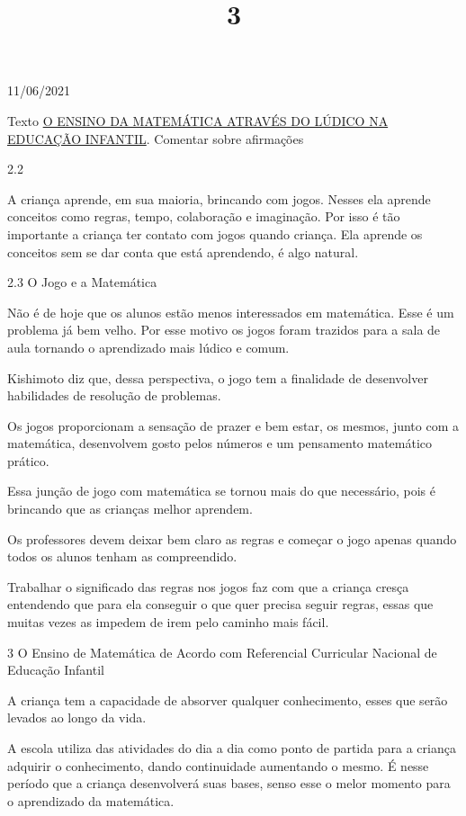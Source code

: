\documentclass{SchoolBook}
\begin{document}
    \begin{day}{11/06/2021}
        \title{3}{Texto \href{https://drive.google.com/file/d/167RWN6Z-7H5BkAholpEdeZX116oSQB6u/view}{O ENSINO DA MATEMÁTICA ATRAVÉS DO LÚDICO NA EDUCAÇÃO INFANTIL}. Comentar sobre afirmações}
        
        2.2
        
        A criança aprende, em sua maioria, brincando com jogos. Nesses ela aprende conceitos como regras, tempo, colaboração e imaginação. Por isso é tão importante a criança ter contato com jogos quando criança. Ela aprende os conceitos sem se dar conta que está aprendendo, é algo natural.
        
        2.3 O Jogo e a Matemática
        
        Não é de hoje que os alunos estão menos interessados em matemática. Esse é um problema já bem velho. Por esse motivo os jogos foram trazidos para a sala de aula tornando o aprendizado mais lúdico e comum.
        
        Kishimoto diz que, dessa perspectiva, o jogo tem a finalidade de desenvolver habilidades de resolução de problemas.
        
        Os jogos proporcionam a sensação de prazer e bem estar, os mesmos, junto com a matemática, desenvolvem gosto pelos números e um pensamento matemático prático.
        
        Essa junção de jogo com matemática se tornou mais do que necessário, pois é brincando que as crianças melhor aprendem.
        
        Os professores devem deixar bem claro as regras e começar o jogo apenas quando todos os alunos tenham as compreendido.
        
        Trabalhar o significado das regras nos jogos faz com que a criança cresça entendendo que para ela conseguir o que quer precisa seguir regras, essas que muitas vezes as impedem de irem pelo caminho mais fácil.
        
        3 O Ensino de Matemática de Acordo com Referencial Curricular Nacional de Educação Infantil
        
        A criança tem a capacidade de absorver qualquer conhecimento, esses que serão levados ao longo da vida.
        
        A escola utiliza das atividades do dia a dia como ponto de partida para a criança adquirir o conhecimento, dando continuidade aumentando o mesmo. É nesse período que a criança desenvolverá suas bases, senso esse o melor momento para o aprendizado da matemática.
        

\end{day}
\end{document}
